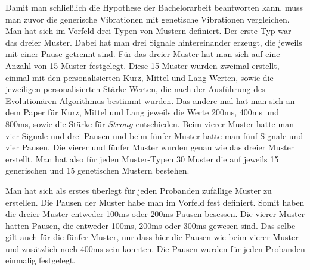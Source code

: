 Damit man schlie{\ss}lich die Hypothese der Bachelorarbeit beantworten kann, muss man zuvor die generische Vibrationen mit genetische Vibrationen vergleichen. 
Man hat sich im Vorfeld drei Typen von Mustern definiert. Der erste Typ war das dreier Muster. Dabei hat man drei Signale hintereinander erzeugt,  die jeweils mit einer Pause getrennt sind. F{\"u}r das dreier Muster hat man sich auf eine Anzahl von 15 Muster festgelegt. 
Diese 15 Muster wurden zweimal erstellt, einmal mit den personalisierten Kurz, Mittel und Lang Werten, sowie die jeweiligen personalisierten St{\"a}rke Werten, die nach der Ausf{\"u}hrung des Evolution{\"a}ren Algorithmus bestimmt wurden. Das andere mal hat man sich an dem Paper \cite{pescara2016ruttelflug} f{\"u}r Kurz, Mittel und Lang jeweils die Werte 200ms, 400ms und 800ms, sowie die St{\"a}rke f{\"u}r $Strong$ entschieden.  
Beim vierer Muster hatte man vier Signale und drei Pausen und beim f{\"u}nfer Muster hatte man f{\"u}nf Signale und vier Pausen. 
Die vierer und f{\"u}nfer Muster wurden genau wie das dreier Muster erstellt. Man hat also f{\"u}r jeden Muster-Typen 30 Muster die auf jeweils 15 generischen und 15 genetischen Mustern bestehen.


Man hat sich als erstes {\"u}berlegt f{\"u}r jeden Probanden zuf{\"a}llige Muster zu erstellen. 
Die Pausen der Muster habe man im Vorfeld fest definiert.
Somit haben die dreier Muster entweder 100ms oder 200ms Pausen besessen.
Die vierer Muster hatten Pausen, die entweder 100ms, 200ms oder 300ms gewesen sind. Das selbe gilt auch f{\"u}r die f{\"u}nfer Muster, nur dass hier die Pausen wie beim vierer Muster und zus{\"a}tzlich noch 400ms sein konnten.
Die Pausen wurden f{\"u}r jeden Probanden einmalig festgelegt.



